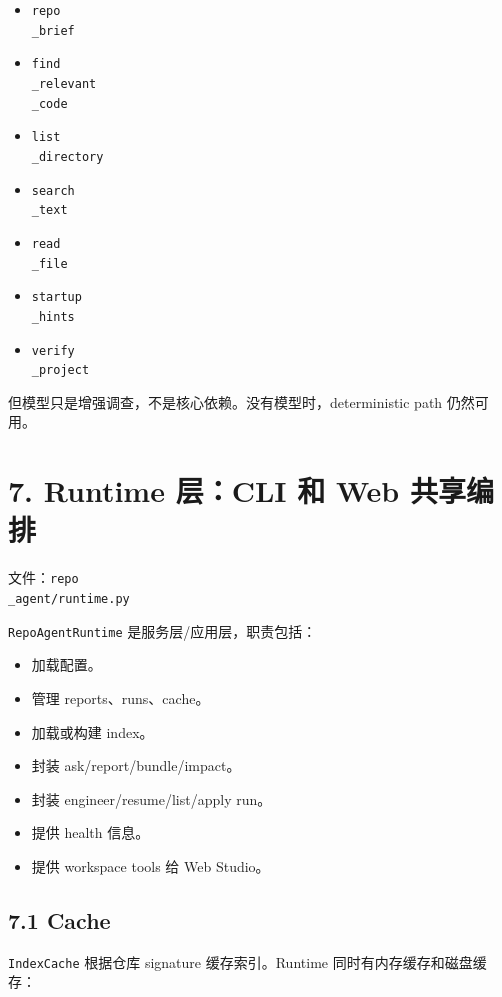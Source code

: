 \documentclass[UTF8,12pt,openany]{ctexbook}
\begin{document}
\begin{itemize}
\item \texttt{repo\\_brief}
\item \texttt{find\\_relevant\\_code}
\item \texttt{list\\_directory}
\item \texttt{search\\_text}
\item \texttt{read\\_file}
\item \texttt{startup\\_hints}
\item \texttt{verify\\_project}
\end{itemize}

但模型只是增强调查，不是核心依赖。没有模型时，deterministic path 仍然可用。\par

\section{7. Runtime 层：CLI 和 Web 共享编排}

文件：\texttt{repo\\_agent/runtime.py}\par

\texttt{RepoAgentRuntime} 是服务层/应用层，职责包括：\par

\begin{itemize}
\item 加载配置。
\item 管理 reports、runs、cache。
\item 加载或构建 index。
\item 封装 ask/report/bundle/impact。
\item 封装 engineer/resume/list/apply run。
\item 提供 health 信息。
\item 提供 workspace tools 给 Web Studio。
\end{itemize}

\subsection{7.1 Cache}

\texttt{IndexCache} 根据仓库 signature 缓存索引。Runtime 同时有内存缓存和磁盘缓存：\par
\end{document}
